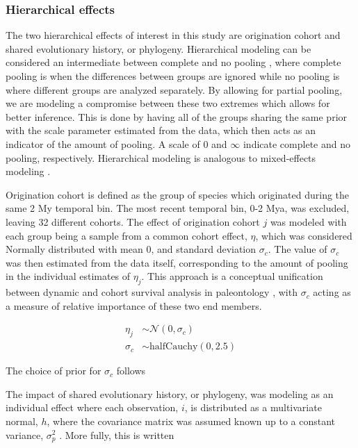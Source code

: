 \documentclass[12pt,letterpaper]{article}
\begin{document}
\subsubsection{Hierarchical effects}

The two hierarchical effects of interest in this study are origination cohort and shared evolutionary history, or phylogeny. Hierarchical modeling can be considered an intermediate between complete and no pooling \citep{Gelman2007}, where complete pooling is when the differences between groups are ignored while no pooling is where different groups are analyzed separately. By allowing for partial pooling, we are modeling a compromise between these two extremes which allows for better inference. This is done by having all of the groups sharing the same prior with the scale parameter estimated from the data, which then acts as an indicator of the amount of pooling. A scale of 0 and \(\infty\) indicate complete and no pooling, respectively. Hierarchical modeling is analogous to mixed-effects modeling \citep{Gelman2007}. 

Origination cohort is defined as the group of species which originated during the same 2 My temporal bin. The most recent temporal bin, 0-2 Mya, was excluded, leaving 32 different cohorts. The effect of origination cohort \(j\) was modeled with each group being a sample from a common cohort effect, \(\eta\), which was considered Normally distributed with mean 0, and standard deviation \(\sigma_{c}\). The value of \(\sigma_{c}\) was then estimated from the data itself, corresponding to the amount of pooling in the individual estimates of \(\eta_{j}\). This approach is a conceptual unification between dynamic and cohort survival analysis in paleontology \citep{Foote1988,Raup1978,Raup1975,VanValen1979,Baumiller1993}, with \(\sigma_{c}\) acting as a measure of relative importance of these two end members.

\begin{align*}
  \eta_{j} &\sim \mathcal{N}(0, \sigma_{c}) \\
  \sigma_{c} &\sim \mathrm{halfCauchy}(0, 2.5)
\end{align*}

The choice of prior for \(\sigma_{c}\) follows \citet{Gelman2006a}

The impact of shared evolutionary history, or phylogeny, was modeling as an individual effect where each observation, \(i\), is distributed as a multivariate normal, \(h\), where the covariance matrix was assumed known up to a constant variance, \(\sigma_{p}^{2}\) \citep{Lynch1991,Housworth2004}. More fully, this is written
\end{document}
